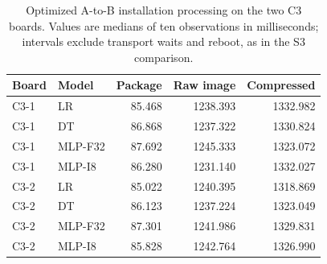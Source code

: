 \begin{table}[!htbp]

\color{RevisionBlue}
\captionsetup{font+=revisionblue}
\caption{Optimized A-to-B installation processing on the two C3 boards. Values are medians of ten observations in milliseconds; intervals exclude transport waits and reboot, as in the S3 comparison.}\label{tab:c3-costs}
\centering\small
\begin{tabular}{llrrr}
\toprule Board & Model & Package & Raw image & Compressed\\
\midrule
C3-1 & LR & 85.468 & 1238.393 & 1332.982\\
C3-1 & DT & 86.868 & 1237.322 & 1330.824\\
C3-1 & MLP-F32 & 87.692 & 1245.333 & 1323.072\\
C3-1 & MLP-I8 & 86.280 & 1231.140 & 1332.027\\
C3-2 & LR & 85.022 & 1240.395 & 1318.869\\
C3-2 & DT & 86.123 & 1237.224 & 1323.049\\
C3-2 & MLP-F32 & 87.301 & 1241.986 & 1329.831\\
C3-2 & MLP-I8 & 85.828 & 1242.764 & 1326.990\\
\bottomrule\end{tabular}

\end{table}
